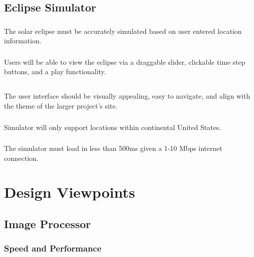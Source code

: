 \documentclass[10pt, onecolumn, draftclsnofoot, letterpaper, compsoc]{IEEEtran}
\begin{document}
\subsection{Eclipse Simulator}
    \subsubsection{}
    The solar eclipse must be accurately simulated based on
    user entered location information. \\

    \subsubsection{}
    Users will be able to view the eclipse via a
    draggable slider, clickable time step buttons, and a play functionality. \\

    \subsection{}
    The user interface should be visually appealing, easy to navigate, and align
    with the theme of the larger project's site. \\

    \subsubsection{}
    Simulator will only support locations within continental
    United States. \\

    \subsubsection{}
    The simulator must load in less than 500ms given a 1-10
    Mbps internet connection. \\


\section{Design Viewpoints}

\subsection{Image Processor}

\subsubsection{Speed and Performance}
\end{document}
